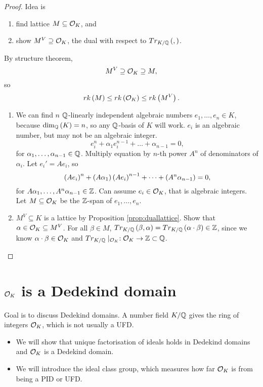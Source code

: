 \begin{proof}
Idea is
\begin{enumerate}
\item find lattice $ M \subseteq \mathcal{O}_K $, and
\item show $ M^V \supseteq \mathcal{O}_K $, the dual with respect to $ Tr_{K / \mathbb{Q}}\left( , \right) $.
\end{enumerate}
By structure theorem,
$$ M^V \supseteq \mathcal{O}_K \supseteq M, $$
so
$$ rk\left( M \right) \le rk\left( \mathcal{O}_K \right) \le rk\left( M^V \right). $$
\begin{enumerate}
\item We can find $ n $ $ \mathbb{Q} $-linearly independent algebraic numbers $ e_1, \dots, e_n \in K $, because $ \dim_{\mathbb{Q}}\left( K \right) = n $, so any $ \mathbb{Q} $-basis of $ K $ will work. $ e_i $ is an algebraic number, but may not be an algebraic integer.
$$ e_i^n + \alpha_1e_i^{n - 1} + \dots + \alpha_{n - 1} = 0, $$
for $ \alpha_1, \dots, \alpha_{n - 1} \in \mathbb{Q} $. Multiply equation by $ n $-th power $ A^n $ of denominators of $ \alpha_i $. Let $ e_i' = Ae_i $, so
$$ \left( Ae_i \right)^n + \left( A\alpha_1 \right)\left( Ae_i \right)^{n - 1} + \dots + \left( A^n\alpha_{n - 1} \right) = 0, $$
for $ A\alpha_1, \dots, A^n\alpha_{n - 1} \in \mathbb{Z} $. Can assume $ e_i \in \mathcal{O}_K $, that is algebraic integers. Let $ M \subseteq \mathcal{O}_K $ be the $ \mathbb{Z} $-span of $ e_1, \dots, e_n $.
\item $ M^V \subseteq K $ is a lattice by Proposition \ref{prop:duallattice}. Show that $ \alpha \in \mathcal{O}_K \subseteq M^V $. For all $ \beta \in M $, $ Tr_{K / \mathbb{Q}}\left( \beta, \alpha \right) = Tr_{K / \mathbb{Q}}\left( \alpha \cdot \beta \right) \in \mathbb{Z} $, since we know $ \alpha \cdot \beta \in \mathcal{O}_K $ and $ Tr_{K / \mathbb{Q}} \mid_{\mathcal{O}_K} : \mathcal{O}_K \to \mathbb{Z} \subset \mathbb{Q} $.
\end{enumerate}
\end{proof}

\pagebreak

\section{$ \mathcal{O}_K $ is a Dedekind domain}


Goal is to discuss Dedekind domains. A number field $ K / \mathbb{Q} $ gives the ring of integers $ \mathcal{O}_K $, which is not usually a UFD.
\begin{itemize}
\item We will show that unique factorisation of ideals holds in Dedekind domains and $ \mathcal{O}_K $ is a Dedekind domain.
\item We will introduce the ideal class group, which measures how far $ \mathcal{O}_K $ is from being a PID or UFD.
\end{itemize}

